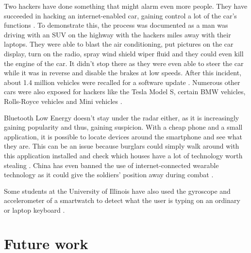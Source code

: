 \documentclass[pdftex,a4paper,12pt,twoside]{report}
\begin{document}
Two hackers have done something that might alarm even more people. They have succeeded in hacking an internet-enabled car, gaining control a lot of the car's functions \citep{greenberg2015}. To demonstrate this, the process was documented as a man was driving with an SUV on the highway with the hackers miles away with their laptops. They were able to blast the air conditioning, put pictures on the car display, turn on the radio, spray wind shield wiper fluid and they could even kill the engine of the car. It didn't stop there as they were even able to steer the car while it was in reverse and disable the brakes at low speeds. After this incident, about 1.4 million vehicles were recalled for a software update \citep{kessler2015}. Numerous other cars were also exposed for hackers like the Tesla Model S, certain BMW vehicles, Rolls-Royce vehicles and Mini vehicles \citep{hirsch2015}.

Bluetooth Low Energy doesn't stay under the radar either, as it is increasingly gaining popularity and thus, gaining suspicion. With a cheap phone and a small application, it is possible to locate devices around the smartphone and see what they are. This can be an issue because burglars could simply walk around with this application installed and check which houses have a lot of technology worth stealing \citep{ashford2015}. China has even banned the use of internet-connected wearable technology as it could give the soldiers' position away during combat \citep{bbcnews2015}.

Some students at the University of Illinois have also used the gyroscope and accelerometer of a smartwatch to detect what the user is typing on an ordinary or laptop keyboard \citep{wang2015mole}.

\section{Future work}
\label{sec:futurework}








\listoffigures
\listoftables
\end{document}
